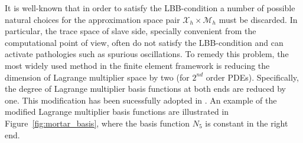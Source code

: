 \documentclass[preprint,12pt]{elsarticle}
\theoremstyle{remark}
\begin{document}
It is well-known that in order to satisfy the LBB-condition a number of possible natural choices for the approximation space pair $\mathcal{X}_h\times{}\mathcal{M}_h$ must be discarded. In particular, the trace space of slave side, specially convenient from the computational point of view, often do not satisfy the LBB-condition and can activate pathologies such as spurious oscillations. To remedy this problem, the most widely used method in the finite element framework is reducing the dimension of Lagrange multiplier space by two (for $2^{nd}$ order PDEs). Specifically, the degree of Lagrange multiplier basis functions at both ends are reduced by one. This modification has been sucessfully adopted in \cite{bernardi_basics_2005, bernardi_domain_1993, belgacem_mortar_1998, belhachmi_resolution_1994, belgacem_mortar_1999, marcinkowski1999mortar, lamichhanehigher, belgacem1999extension}. An example of the modified Lagrange multiplier basis functions are illustrated in Figure~\ref{fig:mortar_basis}, where the basis function $N_5$ is constant in the right end.\par
\end{document}
